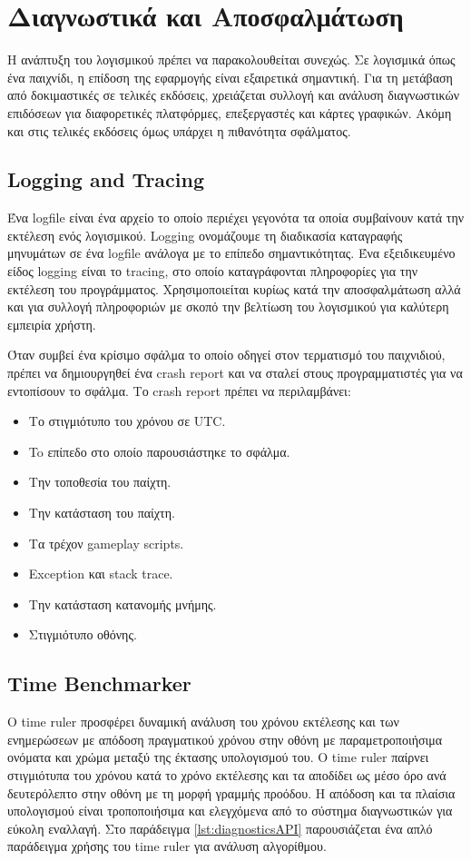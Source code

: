 \chapter{Διαγνωστικά και Αποσφαλμάτωση}
Η ανάπτυξη του λογισμικού πρέπει να παρακολουθείται συνεχώς. Σε λογισμικά όπως ένα παιχνίδι, η επίδοση της εφαρμογής είναι εξαιρετικά σημαντική. Για τη μετάβαση από δοκιμαστικές σε τελικές εκδόσεις, χρειάζεται συλλογή και ανάλυση διαγνωστικών επιδόσεων για διαφορετικές πλατφόρμες, επεξεργαστές και κάρτες γραφικών. Ακόμη και στις τελικές εκδόσεις όμως υπάρχει η πιθανότητα σφάλματος. \cite{richter2012clr}

\section{Logging and Tracing}
Ένα logfile είναι ένα αρχείο το οποίο περιέχει γεγονότα τα οποία συμβαίνουν κατά την εκτέλεση ενός λογισμικού. Logging ονομάζουμε τη διαδικασία καταγραφής μηνυμάτων σε ένα logfile ανάλογα με το επίπεδο σημαντικότητας. Ένα εξειδικευμένο είδος logging είναι το tracing, στο οποίο καταγράφονται πληροφορίες για την εκτέλεση του προγράμματος. Χρησιμοποιείται κυρίως κατά την αποσφαλμάτωση αλλά και για συλλογή πληροφοριών με σκοπό την βελτίωση του λογισμικού για καλύτερη εμπειρία χρήστη.

Όταν συμβεί ένα κρίσιμο σφάλμα το οποίο οδηγεί στον τερματισμό του παιχνιδιού, πρέπει να δημιουργηθεί ένα crash report και να σταλεί στους προγραμματιστές για να εντοπίσουν το σφάλμα.
Το crash report πρέπει να περιλαμβάνει:
\begin{itemize}
 \item Το στιγμιότυπο του χρόνου σε UTC.
 \item To επίπεδο στο οποίο παρουσιάστηκε το σφάλμα.
 \item Την τοποθεσία του παίχτη.
 \item Την κατάσταση του παίχτη.
 \item Τα τρέχον gameplay scripts.
 \item Exception και stack trace.
 \item Την κατάσταση κατανομής μνήμης.
 \item Στιγμιότυπο οθόνης.
\end{itemize}

\section{Time Benchmarker}
Ο time ruler προσφέρει δυναμική ανάλυση του χρόνου εκτέλεσης και των ενημερώσεων με απόδοση πραγματικού χρόνου στην οθόνη με παραμετροποιήσιμα ονόματα και χρώμα μεταξύ της έκτασης υπολογισμού του. O time ruler παίρνει στιγμιότυπα του χρόνου κατά το χρόνο εκτέλεσης και τα αποδίδει ως μέσο όρο ανά δευτερόλεπτο στην οθόνη με τη μορφή γραμμής προόδου.
Η απόδοση και τα πλαίσια υπολογισμού είναι τροποποιήσιμα και ελεγχόμενα από το σύστημα διαγνωστικών για εύκολη εναλλαγή. Στο παράδειγμα \ref{lst:diagnosticsAPI} παρουσιάζεται ένα απλό παράδειγμα χρήσης του time ruler για ανάλυση αλγορίθμου.

